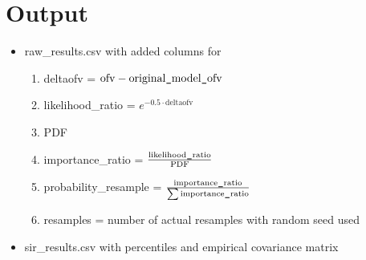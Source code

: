 \section{Output}
\begin{itemize}
\item raw\_results.csv with added columns for
\begin{enumerate}
\item deltaofv = $\mathrm{ofv} - \mathrm{original}\mbox{\tt\string_}\mathrm{model}\mbox{\tt\string_}\mathrm{ofv}$
\item likelihood\_ratio = $e^{-0.5\cdot \mathrm{deltaofv}}$
\item PDF
\item importance\_ratio = $\frac{\mathrm{likelihood}\mbox{\tt\string_}\mathrm{ratio}}{\mathrm{PDF}}$
\item probability\_resample = $\frac{\mathrm{importance}\mbox{\tt\string_}\mathrm{ratio}}{\sum{\mathrm{importance}\mbox{\tt\string_}\mathrm{ratio}}}$
\item resamples = number of actual resamples with random seed used
\end{enumerate}
\item sir\_results.csv with percentiles and empirical covariance matrix
\end{itemize}



